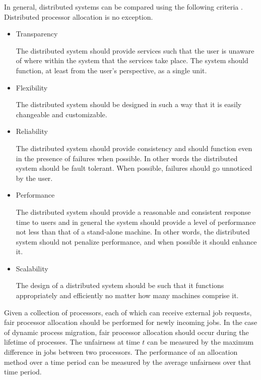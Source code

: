 \documentclass{article}
\begin{document}
In general, distributed systems can be compared using the following
criteria \cite{Tanenbaum}.  Distributed processor allocation is no
exception.


\begin{itemize}
	
  \item Transparency

	The distributed system should provide services such that the user is
	unaware of where within the system that the services take place.
	The system should function, at least from the user's perspective, as
	a single unit. 


  \item Flexibility

	The distributed system should be designed in such a way that it is
	easily changeable and customizable.

  \item Reliability

	The distributed system should provide consistency and should
	function even in the presence of failures when possible.  In other
	words the distributed system should be fault tolerant.  When
	possible, failures should go unnoticed by the user.

  \item Performance

	The distributed system should provide a reasonable and consistent
	response time to users and in general the system should provide a
	level of performance not less than that of a stand-alone machine.
	In other words, the distributed system should not penalize
	performance, and when possible it should enhance it.

  \item Scalability

	The design of a distributed system should be such that it functions
	appropriately and efficiently no matter how many machines comprise
	it.  

\end{itemize}


Given a collection of processors, each of which can receive external job
requests, fair processor allocation should be performed for newly incoming
jobs.  In the case of dynamic process migration, fair processor allocation
should occur during the lifetime of processes.  The unfairness at time $t$
can be measured by the maximum difference in jobs between two processors.
The performance of an allocation method over a time period can be measured
by the average unfairness over that time period.
\end{document}
